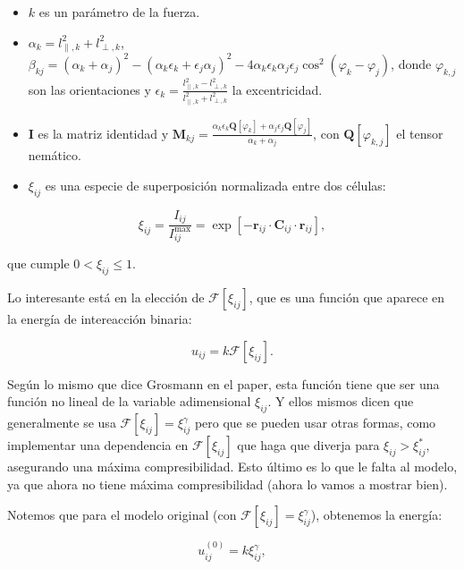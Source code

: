 \documentclass[11pt,a4paper]{article}
\begin{document}
\begin{itemize}
	\item $k$ es un parámetro de la fuerza.
	\item $\alpha_k=l_{\parallel, k}^{2}+l_{\perp, k}^{2}$, $\beta_{kj}=(\alpha_k+\alpha_j)^{2}-(\alpha_k \epsilon_k+\epsilon_j \alpha_j)^{2}-4\alpha_k\epsilon_k\alpha_j\epsilon_j \cos^{2}(\varphi_k-\varphi_j)$, donde $\varphi_{k, j}$ son las orientaciones y $\epsilon_k=\frac{l_{\parallel, k}^{2}-l_{\perp, k}^{2}}{l_{\parallel, k}^{2}+l_{\perp, k}^{2}}$ la excentricidad.
	\item $\mathbf{I}$ es la matriz identidad y $\mathbf{M}_{kj}=\frac{\alpha_k \epsilon_k \mathbf{Q}[\varphi_k]+\alpha_j \epsilon_j \mathbf{Q}[\varphi_j]}{\alpha_k+\alpha_j}$, con $\mathbf{Q}[\varphi_{k, j}]$ el tensor nemático.
	\item $\xi_{ij}$ es una especie de superposición normalizada entre dos células:
\end{itemize}

\begin{equation}
	\xi_{ij}
	=
	\frac{I_{ij}}{I_{ij}^{\max}}
	=
	\exp\left[
	-\mathbf r_{ij}\cdot
	\mathbf C_{ij}\cdot
	\mathbf r_{ij}
	\right],
	\label{eq:normalized_overlap}
\end{equation}

que cumple $0<\xi_{ij}\leq1$.

Lo interesante está en la elección de $\mathcal{F}[\xi_{ij}]$, que es una función que aparece en la energía de intereacción binaria:

\begin{equation}
	u_{ij}
	=
	k\mathcal{F}[\xi_{ij}].
	\label{eq:energy}
\end{equation}

Según lo mismo que dice Grosmann en el paper, esta función tiene que ser una función no lineal de la variable adimensional $\xi_{ij}$. Y ellos mismos dicen que generalmente se usa $\mathcal{F}[\xi_{ij}]=\xi_{ij}^{\gamma}$ pero que se pueden usar otras formas, como implementar una dependencia en $\mathcal{F}[\xi_{ij}]$ que haga que diverja para $\xi_{ij}>\xi_{ij}^{*}$, asegurando una máxima compresibilidad. Esto último es lo que le falta al modelo, ya que ahora no tiene máxima compresibilidad (ahora lo vamos a mostrar bien).

Notemos que para el modelo original (con $\mathcal{F}[\xi_{ij}]=\xi_{ij}^{\gamma}$), obtenemos la energía:

\begin{equation}
u_{ij}^{(0)}
=
k\xi_{ij}^{\gamma},
\label{eq:original_energy}
\end{equation}
\end{document}
